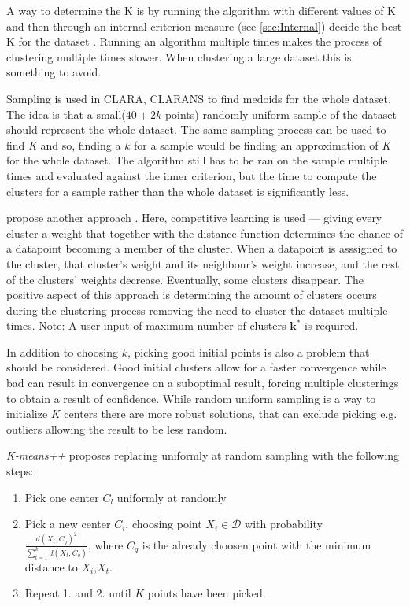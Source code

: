 \documentclass[../report.tex]{subfiles}
\begin{document}
A way to determine the K is by running the algorithm with different values of K and then through an internal criterion measure (see \ref{sec:Internal}) decide the best K for the dataset \cite{Huang97clusteringlarge, Sugar2003}. Running an algorithm multiple times makes the process of clustering multiple times slower. When clustering a large dataset this is something to avoid.

Sampling is used in CLARA, CLARANS \cite{Ng2002} to find medoids for the whole dataset. The idea is that a small($40 + 2k$ points) randomly uniform sample of the dataset should represent the whole dataset. The same sampling process can be used to find \textit{K} and so, finding a ${k}$ for a sample would be finding an approximation of \textit{K} for the whole dataset. The algorithm still has to be ran on the sample multiple times and evaluated against the inner criterion, but the time to compute the clusters for a sample rather than the whole dataset is significantly less.

\citeauthor{Cheung2013} propose another approach \cite{Cheung2013, Jia2018}. Here, competitive learning is used --- giving every cluster a weight that together with the distance function determines the chance of a datapoint becoming a member of the cluster. When a datapoint is asssigned to the cluster, that cluster's weight and its neighbour's weight increase, and the rest of the clusters' weights decrease. Eventually, some clusters disappear. The positive aspect of this approach is determining the amount of clusters occurs during the clustering process removing the need to cluster the dataset multiple times. Note: A user input of maximum number of clusters $\mathbf{k^*}$ is required.

In addition to choosing $k$, picking good initial points is also a problem that should be considered. Good initial clusters allow for a faster convergence while bad can result in convergence on a suboptimal result\cite{Arthur2006, Jia2018}, forcing multiple clusterings to obtain a result of confidence. While random uniform sampling is a way to initialize $K$ centers there are more robust solutions, that can exclude picking e.g. outliers allowing the result to be less random. 

\textit{K-means++}\cite{Arthur2006} proposes replacing uniformly at random sampling with the following steps:

\begin{enumerate}
  \item Pick one center $C_l$ uniformly at randomly
  \item Pick a new center $C_i$, choosing point $X_i \in \mathcal{D}$ with probability \\ $\frac{d(X_i,C_q)^2}{\sum_{t=1}^{k}{d(X_t,C_q)}}$, where $C_q$ is the already choosen point with the minimum distance to $X_i$,$X_t$.
  \item Repeat 1. and 2. until $K$ points have been picked.
\end{enumerate}
\end{document}
